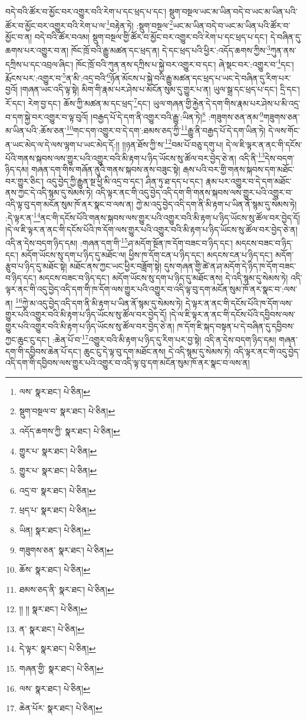 བདེ་བའི་ཚོར་བ་མྱོང་བར་འགྱུར་བའི་རེག་པ་དང་ཕྲད་པ་དང་། སྡུག་བསྔལ་ཡང་མ་ཡིན་བདེ་བ་ཡང་མ་ཡིན་པའི་ཚོར་བ་མྱོང་བར་འགྱུར་བའི་རེག་པ་ལ་\footnote{ལས་  སྣར་ཐང་།  པེ་ཅིན། }བརྟེན་ཏེ། :སྡུག་བསྔལ་\footnote{སྡུག་བསྔལ་བ་  སྣར་ཐང་།  པེ་ཅིན། }ཡང་མ་ཡིན་བདེ་བ་ཡང་མ་ཡིན་པའི་ཚོར་བ་མྱོང་བ་ན། བདེ་བའི་ཚོར་བའམ། སྡུག་བསྔལ་གྱི་ཚོར་བ་མྱོང་བར་འགྱུར་བའི་རེག་པ་དང་ཕྲད་པ་དང་། དེ་བཞིན་དུ་ཆགས་པར་འགྱུར་བ་ན། ཁོང་ཁྲོ་བའི་རྒྱུ་མཚན་དང་ཕྲད་ན། དེ་དང་ཕྲད་པའི་ཕྱིར་:འདོད་ཆགས་ཀྱིས་\footnote{འདོད་ཆགས་ཀྱི་  སྣར་ཐང་།  པེ་ཅིན། }ཀུན་ནས་དཀྲིས་པ་དང་འབྲལ་ཞིང་། ཁོང་ཁྲོ་བའི་ཀུན་ནས་དཀྲིས་པ་སྐྱེ་བར་འགྱུར་བ་དང་། ཞེ་སྡང་བར་:འགྱུར་བ་\footnote{གྱུར་པ་  སྣར་ཐང་།  པེ་ཅིན། }དང་། རྨོངས་པར་:འགྱུར་བ་\footnote{གྱུར་པ་  སྣར་ཐང་།  པེ་ཅིན། }ན་མི་:འདྲ་བའི་\footnote{འདྲ་བ་  སྣར་ཐང་།  པེ་ཅིན། }ཉོན་མོངས་པ་སྐྱེ་བའི་རྒྱུ་མཚན་དང་ཕྲད་པ་ཡང་དེ་བཞིན་དུ་རིག་པར་བྱའོ། །གཞན་ཡང་འདི་ལྟ་སྟེ། མིག་གི་རྣམ་པར་ཤེས་པ་མངོན་སུམ་དུ་གྱུར་པ་ན། ཡུལ་སྒྲ་དང་ཕྲད་པ་དང་། དྲི་དང་། རོ་དང་། རེག་བྱ་དང་། ཆོས་ཀྱི་མཚན་མ་དང་ཕྲད་\footnote{ཕྲད་པ་  སྣར་ཐང་།  པེ་ཅིན། }དང་། ཡུལ་གཞན་གྱི་རྐྱེན་དེ་དག་གིས་རྣམ་པར་ཤེས་པ་མི་འདྲ་བ་དག་སྐྱེ་བར་འགྱུར་བ་ལྟ་བུའོ། །བརྒྱད་པོ་དེ་དག་ནི་འགྱུར་བའི་རྒྱུ་:ཡིན་ཏེ།\footnote{ཡིན།  སྣར་ཐང་།  པེ་ཅིན། } :གཟུགས་ཅན་ནམ་\footnote{གཟུགས་ཅན་  སྣར་ཐང་།  པེ་ཅིན། }གཟུགས་ཅན་མ་ཡིན་པའི་:ཆོས་ཅན་\footnote{ཆོས་  སྣར་ཐང་།  པེ་ཅིན། }གང་དག་འགྱུར་བ་དེ་དག་:ཐམས་ཅད་ཀྱི་\footnote{ཐམས་ཅད་ནི་  སྣར་ཐང་།  པེ་ཅིན། }རྒྱུ་ནི་བརྒྱད་པོ་དེ་དག་ཡིན་ཏེ། དེ་ལས་གོང་ན་ཡང་མེད་ལ་དེ་ལས་ལྷག་པ་ཡང་མེད་དོ:།། །།ཉན་ཐོས་ཀྱི་ས་\footnote{།། །།  སྣར་ཐང་།  པེ་ཅིན། }བམ་པོ་བཅུ་དགུ་པ། དེ་ལ་ཇི་ལྟར་ན་ནང་གི་དངོས་པོའི་གནས་སྐབས་ལས་གྱུར་པའི་འགྱུར་བའི་མི་རྟག་པ་ཉིད་ཡོངས་སུ་ཚོལ་བར་བྱེད་ཅེ་ན། འདི་ནི་\footnote{ན་  སྣར་ཐང་།  པེ་ཅིན། }དེས་བདག་ཉིད་དམ། གཞན་དག་གིས་གཞོན་ནུའི་གནས་སྐབས་ནས་བཟུང་སྟེ། རྒས་པའི་བར་གྱི་གནས་སྐབས་དག་མཐོང་བར་གྱུར་ཅིང་། འདུ་བྱེད་ཀྱི་རྒྱུན་སྔ་ཕྱི་མི་འདྲ་བ་དང་། ཤིན་ཏུ་ཐ་དད་པ་དང་། རྣམ་པར་འགྱུར་བ་དེ་དག་མཐོང་ནས་ཀྱང་དེ་འདི་སྙམ་དུ་སེམས་ཏེ། འདི་ལྟར་ནང་གི་འདུ་བྱེད་འདི་དག་གི་གནས་སྐབས་ལས་གྱུར་པའི་འགྱུར་བ་འདི་ལྟ་བུ་དག་མངོན་སུམ་ཁོ་ནར་སྣང་བ་ལས་ན། ཀྱེ་མ་འདུ་བྱེད་འདི་དག་ནི་མི་རྟག་པ་ཡིན་ནོ་སྙམ་དུ་སེམས་ཏེ། :དེ་ལྟར་ན་\footnote{དེ་ལྟར་  སྣར་ཐང་།  པེ་ཅིན། }ནང་གི་དངོས་པོའི་གནས་སྐབས་ལས་གྱུར་པའི་འགྱུར་བའི་མི་རྟག་པ་ཉིད་ཡོངས་སུ་ཚོལ་བར་བྱེད་དོ། །དེ་ལ་ཇི་ལྟར་ན་ནང་གི་དངོས་པོའི་ཁ་དོག་ལས་གྱུར་པའི་འགྱུར་བའི་མི་རྟག་པ་ཉིད་ཡོངས་སུ་ཚོལ་བར་བྱེད་ཅེ་ན། འདི་ན་དེས་བདག་ཉིད་དམ། :གཞན་དག་གི་\footnote{གཞན་གྱི་  སྣར་ཐང་།  པེ་ཅིན། }ཤ་མདོག་སྔོན་ཁ་དོག་བཟང་བ་ཉིད་དང་། མདངས་བཟང་བ་ཉིད་དང་། མདོག་ཡོངས་སུ་དག་པ་ཉིད་དུ་མཐོང་ལ། ཕྱིས་ཁ་དོག་ངན་པ་ཉིད་དང་། མདངས་ངན་པ་ཉིད་དང་། མདོག་རྩུབ་པ་ཉིད་དུ་མཐོང་སྟེ། མཐོང་ནས་ཀྱང་ཡང་ཕྱིར་བཟློག་སྟེ། དུས་གཞན་གྱི་ཚེ་ན་ཤ་མདོག་དེ་ཉིད་ཁ་དོག་བཟང་བ་ཉིད་དང་། མདངས་བཟང་བ་ཉིད་དང་། མདོག་ཡོངས་སུ་དག་པ་ཉིད་དུ་མཐོང་ནས། དེ་འདི་སྙམ་དུ་སེམས་ཏེ། འདི་ལྟར་ནང་གི་འདུ་བྱེད་འདི་དག་གི་ཁ་དོག་ལས་གྱུར་པའི་འགྱུར་བ་འདི་ལྟ་བུ་དག་མངོན་སུམ་ཁོ་ནར་སྣང་བ་:ལས་ན། \footnote{ལས་  སྣར་ཐང་།  པེ་ཅིན། }ཀྱེ་མ་འདུ་བྱེད་འདི་དག་ནི་མི་རྟག་པ་ཡིན་ནོ་སྙམ་དུ་སེམས་ཏེ། དེ་ལྟར་ན་ནང་གི་དངོས་པོའི་ཁ་དོག་ལས་གྱུར་པའི་འགྱུར་བའི་མི་རྟག་པ་ཉིད་ཡོངས་སུ་ཚོལ་བར་བྱེད་དོ། །དེ་ལ་ཇི་ལྟར་ན་ནང་གི་དངོས་པོའི་དབྱིབས་ལས་གྱུར་པའི་འགྱུར་བའི་མི་རྟག་པ་ཉིད་ཡོངས་སུ་ཚོལ་བར་བྱེད་ཅེ་ན། ཁ་དོག་ཇི་སྐད་བསྟན་པ་དེ་བཞིན་དུ་དབྱིབས་ཀྱང་ཆུང་ངུ་དང་། :ཆེན་པོ་བ་\footnote{ཆེན་པོར་  སྣར་ཐང་།  པེ་ཅིན། }འགྱུར་བའི་མི་རྟག་པ་ཉིད་དུ་རིག་པར་བྱ་སྟེ། འདི་ན་དེས་བདག་ཉིད་དམ། གཞན་དག་གི་དབྱིབས་ཆེན་པོ་དང་། ཆུང་ངུ་དེ་ལྟ་བུ་དག་མཐོང་ནས། དེ་འདི་སྙམ་དུ་སེམས་ཏེ། འདི་ལྟར་ནང་གི་འདུ་བྱེད་འདི་དག་གི་དབྱིབས་ལས་གྱུར་པའི་འགྱུར་བ་འདི་ལྟ་བུ་དག་མངོན་སུམ་ཁོ་ནར་སྣང་བ་ལས་ན། 